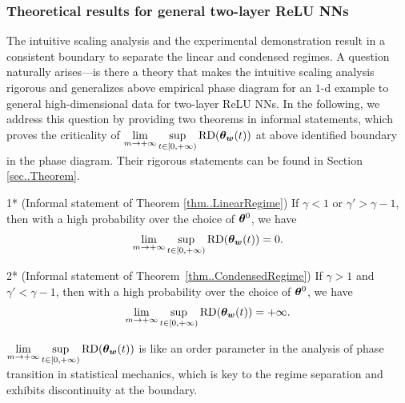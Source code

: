 \documentclass{article}
\begin{document}
\subsubsection{Theoretical results for general two-layer ReLU NNs}
The intuitive scaling analysis and the experimental demonstration result in a consistent boundary to separate the linear and condensed regimes. A question naturally arises---is there a theory that makes the intuitive scaling analysis rigorous and generalizes above empirical phase diagram for an $1$-d example to general high-dimensional data for two-layer ReLU NNs. 
In the following, we address this question by providing two theorems in informal statements, which proves the criticality of $\lim\limits_{m\to+\infty}\sup\limits_{t\in[0,+\infty)}\mathrm{RD}(\bm{\theta}_{\bm{w}}(t))$ at above identified boundary in the phase diagram. Their rigorous statements can be found in Section \ref{sec..Theorem}.



\begin{customthm}{1*}
    (Informal statement of Theorem \ref{thm..LinearRegime}) If $\gamma<1$ or $\gamma'>\gamma-1$, then with a high probability over the choice of $\bm{\theta}^0$, we have
    \begin{equation}
        \lim_{m\to+\infty}\sup\limits_{t\in[0,+\infty)}\mathrm{RD}(\bm{\theta}_{\bm{w}}(t))=0.
    \end{equation}
\end{customthm}
\begin{customthm}{2*}
    (Informal statement of Theorem~\ref{thm..CondensedRegime}) If $\gamma>1$ and $\gamma'<\gamma-1$, then with a high probability over the choice of $\bm{\theta}^0$, we have
    \begin{equation}
        \lim_{m\to+\infty} \sup\limits_{t\in[0,+\infty)}\mathrm{RD}(\bm{\theta}_{\bm{w}}(t))=+\infty.
    \end{equation}
\end{customthm}
\begin{rmk}
 $\lim\limits_{m\to+\infty}\sup\limits_{t\in[0,+\infty)}\mathrm{RD}(\bm{\theta}_{\bm{w}}(t))$ is like an order parameter in the analysis of phase transition in statistical mechanics, which is key to the regime separation and exhibits discontinuity at the boundary.
\end{rmk}
\end{document}
